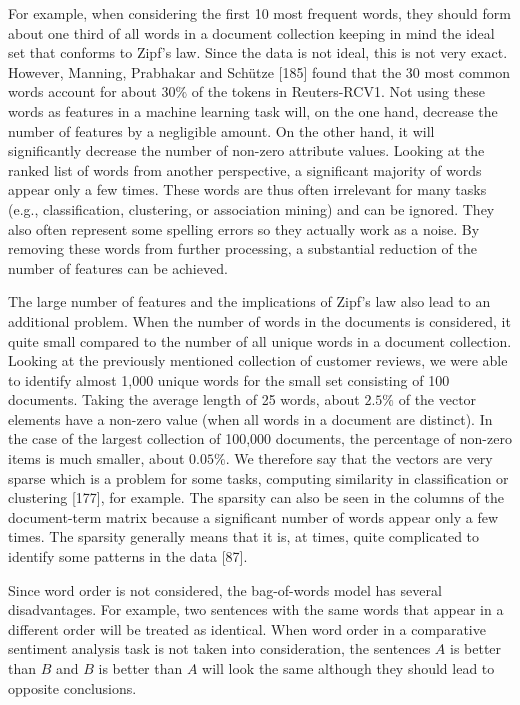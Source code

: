 \documentclass[10pt]{book}
\begin{document}
For example, when considering the first 10 most frequent words, they should form about one third of all words in a document collection keeping in mind the ideal set that conforms to Zipf's law. Since the data is not ideal, this is not very exact. However, Manning, Prabhakar and Schütze [185] found that the 30 most common words account for about $30 \%$ of the tokens in Reuters-RCV1. Not using these words as features in a machine learning task will, on the one hand, decrease the number of features by a negligible amount. On the other hand, it will significantly decrease the number of non-zero attribute values. Looking at the ranked list of words from another perspective, a significant majority of words appear only a few times. These words are thus often irrelevant for many tasks (e.g., classification, clustering, or association mining) and can be ignored. They also often represent some spelling errors so they actually work as a noise. By removing these words from further processing, a substantial reduction of the number of features can be achieved.

The large number of features and the implications of Zipf's law also lead to an additional problem. When the number of words in the documents is considered, it quite small compared to the number of all unique words in a document collection. Looking at the previously mentioned collection of customer reviews, we were able to identify almost 1,000 unique words for the small set consisting of 100 documents. Taking the average length of 25 words, about $2.5 \%$ of the vector elements have a non-zero value (when all words in a document are distinct). In the case of the largest collection of 100,000 documents, the percentage of non-zero items is much smaller, about $0.05 \%$. We therefore say that the vectors are very sparse which is a problem for some tasks, computing similarity in classification or clustering [177], for example. The sparsity can also be seen in the columns of the document-term matrix because a significant number of words appear only a few times. The sparsity generally means that it is, at times, quite complicated to identify some patterns in the data [87].

Since word order is not considered, the bag-of-words model has several disadvantages. For example, two sentences with the same words that appear in a different order will be treated as identical. When word order in a comparative sentiment analysis task is not taken into consideration, the sentences $A$ is better than $B$ and $B$ is better than $A$ will look the same although they should lead to opposite conclusions.
\end{document}
